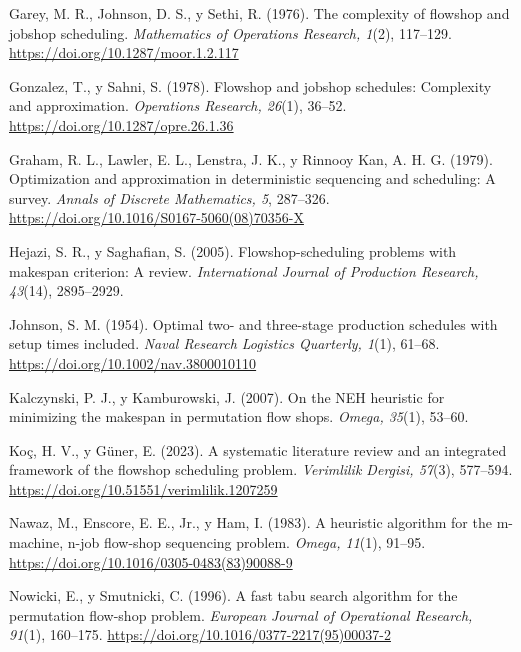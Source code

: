 \begin{list}{}{\setlength{\leftmargin}{0.5in}\setlength{\itemindent}{-0.5in}%
  \setlength{\itemsep}{0pt}\setlength{\parsep}{0pt}\setlength{\topsep}{0pt}}
\item Garey, M. R., Johnson, D. S., y Sethi, R. (1976). The complexity of flowshop and jobshop
scheduling. \textit{Mathematics of Operations Research, 1}(2), 117--129.
\url{https://doi.org/10.1287/moor.1.2.117}

\item Gonzalez, T., y Sahni, S. (1978). Flowshop and jobshop schedules: Complexity and
approximation. \textit{Operations Research, 26}(1), 36--52.
\url{https://doi.org/10.1287/opre.26.1.36}

\item Graham, R. L., Lawler, E. L., Lenstra, J. K., y Rinnooy Kan, A. H. G. (1979).
Optimization and approximation in deterministic sequencing and scheduling: A survey.
\textit{Annals of Discrete Mathematics, 5}, 287--326.
\url{https://doi.org/10.1016/S0167-5060(08)70356-X}

\item Hejazi, S. R., y Saghafian, S. (2005). Flowshop-scheduling problems with makespan
criterion: A review. \textit{International Journal of Production Research, 43}(14),
2895--2929.

\item Johnson, S. M. (1954). Optimal two- and three-stage production schedules with setup
times included. \textit{Naval Research Logistics Quarterly, 1}(1), 61--68.
\url{https://doi.org/10.1002/nav.3800010110}

\item Kalczynski, P. J., y Kamburowski, J. (2007). On the NEH heuristic for minimizing the
makespan in permutation flow shops. \textit{Omega, 35}(1), 53--60.

\item Koç, H. V., y Güner, E. (2023). A systematic literature review and an integrated
framework of the flowshop scheduling problem. \textit{Verimlilik Dergisi, 57}(3), 577--594.
\url{https://doi.org/10.51551/verimlilik.1207259}

\item Nawaz, M., Enscore, E. E., Jr., y Ham, I. (1983). A heuristic algorithm for the
m-machine, n-job flow-shop sequencing problem. \textit{Omega, 11}(1), 91--95.
\url{https://doi.org/10.1016/0305-0483(83)90088-9}

\item Nowicki, E., y Smutnicki, C. (1996). A fast tabu search algorithm for the permutation
flow-shop problem. \textit{European Journal of Operational Research, 91}(1), 160--175.
\url{https://doi.org/10.1016/0377-2217(95)00037-2}


\end{list}
